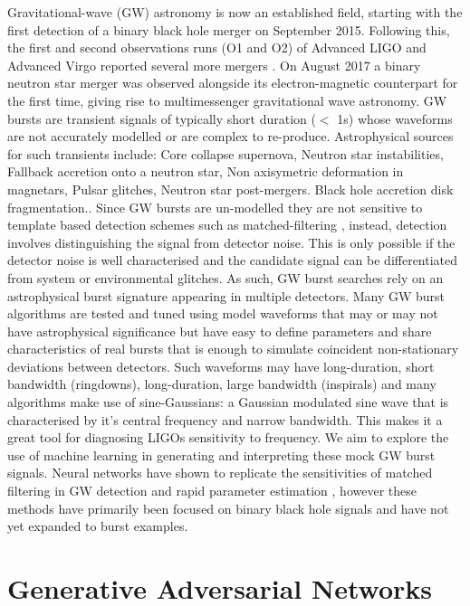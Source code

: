 \documentclass[12pt]{iopart}
\begin{document}
Gravitational-wave (GW) astronomy is now an established field, starting with the first detection of a binary black hole merger \cite{} on September 2015. Following this, the first and second observations runs (O1 and O2) of Advanced LIGO and Advanced Virgo reported several more mergers \cite{}. On August 2017 a binary neutron star merger was observed alongside its electron-magnetic counterpart for the first time, giving rise to multimessenger gravitational wave astronomy. 
GW bursts are transient signals of typically short duration ($<$ 1s) whose waveforms are not accurately modelled or are complex to re-produce. Astrophysical sources for such transients include: Core collapse supernova, Neutron star instabilities, Fallback accretion onto a neutron star, Non axisymetric deformation in magnetars, Pulsar glitches, Neutron star post-mergers.
Black hole accretion disk fragmentation.. Since GW bursts are un-modelled they are not sensitive to template based detection schemes such as matched-filtering \cite{}, instead, detection involves distinguishing the signal from detector noise. This is only possible if the detector noise is well characterised and the candidate signal can be differentiated from system or environmental glitches. As such, GW burst searches rely on an astrophysical burst signature appearing in multiple detectors.
Many GW burst algorithms \cite{} are tested and tuned using model waveforms that may or may not have astrophysical significance but have easy to define parameters and share characteristics of real bursts that is enough to simulate coincident non-stationary deviations between detectors. Such waveforms may have long-duration, short bandwidth (ringdowns), long-duration, large bandwidth (inspirals) and many algorithms make use of sine-Gaussians: a Gaussian modulated sine wave that is characterised by it's central frequency and narrow bandwidth. This makes it a great tool for diagnosing LIGOs sensitivity to frequency. 
We aim to explore the use of machine learning in generating and interpreting these mock GW burst signals. Neural networks have shown to replicate the sensitivities of matched filtering in GW detection \cite{} and rapid parameter estimation \cite{}, however these methods have primarily been focused on binary black hole signals and have not yet expanded to burst examples. 

\section{Generative Adversarial Networks}
\end{document}

